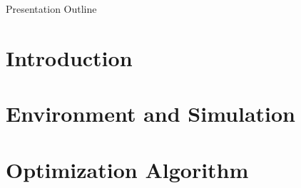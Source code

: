 \documentclass[11pt]{beamer}
\begin{document}
\frame{\titlepage}

\begin{frame}{Presentation Outline}
\begin{tiny}
    \tableofcontents[hideallsubsections]
\end{tiny}
\end{frame}

\AtBeginSection[]
{
\begin{frame}{}
    \tableofcontents[sections={\thesection}]
\end{frame}
}


\section{Introduction}






\section{Environment and Simulation}






\section{Optimization Algorithm}






\end{document}
